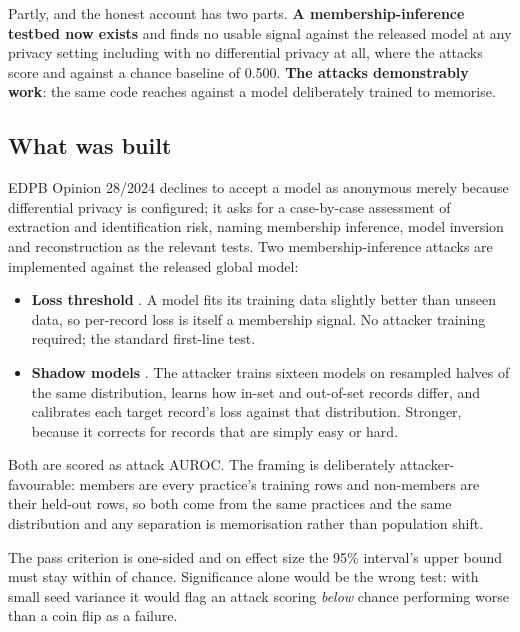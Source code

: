 \label{sec:anontest}
\statusMeasured

\begin{shortanswer}
Partly, and the honest account has two parts. \textbf{A membership-inference testbed now exists}
and finds no usable signal against the released model at any privacy setting including with no
differential privacy at all, where the attacks score \MIANoDPThreshold{} and \MIANoDPShadow{} against
a chance baseline of 0.500. \textbf{The attacks demonstrably work}: the same code reaches
\MIAControlShadow{} against a model deliberately trained to memorise.
\end{shortanswer}

\subsection{What was built}

EDPB Opinion 28/2024 \cite{edpb2024ai} declines to accept a model as anonymous merely because
differential privacy is configured; it asks for a case-by-case assessment of extraction and
identification risk, naming membership inference, model inversion and reconstruction as the relevant
tests. Two membership-inference attacks are implemented against the released global model:

\begin{itemize}
  \item \textbf{Loss threshold} \cite{yeom2018privacy}. A model fits its training data slightly
        better than unseen data, so per-record loss is itself a membership signal. No attacker
        training required; the standard first-line test.
  \item \textbf{Shadow models} \cite{shokri2017membership}. The attacker trains sixteen models on
        resampled halves of the same distribution, learns how in-set and out-of-set records differ,
        and calibrates each target record's loss against that distribution. Stronger, because it
        corrects for records that are simply easy or hard.
\end{itemize}

Both are scored as attack AUROC. The framing is deliberately attacker-favourable: members are every
practice's training rows and non-members are their held-out rows, so both come from the same
practices and the same distribution and any separation is memorisation rather than population shift.

The pass criterion is one-sided and on effect size the 95\% interval's upper bound must stay
within \MIAMargin{} of chance. Significance alone would be the wrong test: with small seed variance
it would flag an attack scoring \emph{below} chance performing worse than a coin flip as a
failure.

